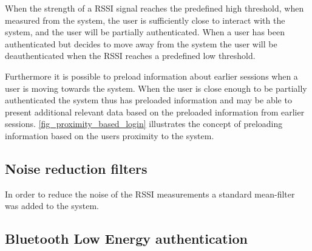 
When the strength of a RSSI signal reaches the predefined high threshold, when measured from the system, the user is sufficiently close to interact with the system, and the user will be partially authenticated.
When a user has been authenticated but decides to move away from the system the user will be deauthenticated when the RSSI reaches a predefined low threshold.

Furthermore it is possible to preload information about earlier sessions when a user is moving towards the system.
When the user is close enough to be partially authenticated the system thus has preloaded information and may be able to present additional relevant data based on the preloaded information from earlier sessions. 
\cref{fig_proximity_based_login} illustrates the concept of preloading information based on the users proximity to the system.

\subsection{Noise reduction filters}
In order to reduce the noise of the RSSI measurements a standard mean-filter was added to the system.

\subsection{Bluetooth Low Energy authentication}
